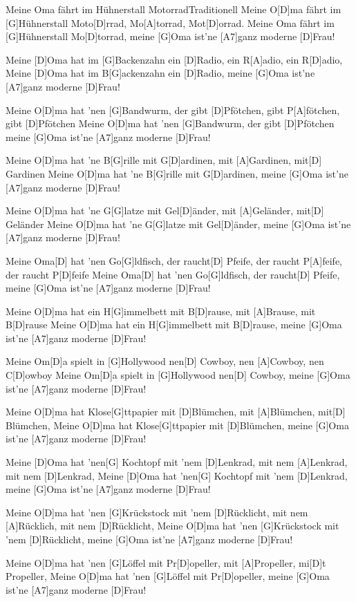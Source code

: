 \documentclass[../main.tex]{subfiles}
\begin{document}
\begin{song}{Meine Oma fährt im Hühnerstall Motorrad}{Traditionell}{}
Meine O[D]ma fährt im [G]Hühnerstall Moto[D]rrad, Mo[A]torrad, Mot[D]orrad.
Meine Oma fährt im [G]Hühnerstall Mo[D]torrad, meine [G]Oma ist’ne [A7]ganz moderne [D]Frau!

Meine [D]Oma hat im [G]Backenzahn ein [D]Radio, ein R[A]adio, ein R[D]adio,
Meine [D]Oma hat im B[G]ackenzahn ein [D]Radio, meine [G]Oma ist’ne [A7]ganz moderne [D]Frau!

Meine O[D]ma hat ’nen [G]Bandwurm, der gibt [D]Pfötchen, gibt P[A]fötchen, gibt [D]Pfötchen
Meine O[D]ma hat ’nen [G]Bandwurm, der gibt [D]Pfötchen meine [G]Oma ist’ne [A7]ganz moderne [D]Frau!

Meine O[D]ma hat ’ne B[G]rille mit G[D]ardinen, mit [A]Gardinen, mit[D] Gardinen
Meine O[D]ma hat ’ne B[G]rille mit G[D]ardinen, meine [G]Oma ist’ne [A7]ganz moderne [D]Frau!

Meine O[D]ma hat ’ne G[G]latze mit Gel[D]{ä}nder, mit [A]Geländer, mit[D] Geländer
Meine O[D]ma hat ’ne G[G]latze mit Gel[D]{ä}nder, meine [G]Oma ist’ne [A7]ganz moderne [D]Frau!

Meine Oma[D] hat ’nen Go[G]ldfisch, der raucht[D] Pfeife, der raucht P[A]feife, der raucht P[D]feife
Meine Oma[D] hat ’nen Go[G]ldfisch, der raucht[D] Pfeife, meine [G]Oma ist’ne [A7]ganz moderne [D]Frau!

Meine O[D]ma hat ein H[G]immelbett mit B[D]rause, mit [A]Brause, mit B[D]rause
Meine O[D]ma hat ein H[G]immelbett mit B[D]rause, meine [G]Oma ist’ne [A7]ganz moderne [D]Frau!

Meine Om[D]a spielt in [G]Hollywood nen[D] Cowboy, nen [A]Cowboy, nen C[D]owboy
Meine Om[D]a spielt in [G]Hollywood nen[D] Cowboy, meine [G]Oma ist’ne [A7]ganz moderne [D]Frau!

Meine O[D]ma hat Klose[G]ttpapier mit [D]Blümchen, mit [A]Blümchen, mit[D] Blümchen,
Meine O[D]ma hat Klose[G]ttpapier mit [D]Blümchen, meine [G]Oma ist’ne [A7]ganz moderne [D]Frau!

Meine [D]Oma hat ’nen[G] Kochtopf mit ’nem [D]Lenkrad, mit nem [A]Lenkrad, mit nem [D]Lenkrad,
Meine [D]Oma hat ’nen[G] Kochtopf mit ’nem [D]Lenkrad, meine [G]Oma ist’ne [A7]ganz moderne [D]Frau!

Meine O[D]ma hat ’nen [G]Krückstock mit ’nem [D]Rücklicht, mit nem [A]Rücklich, mit nem [D]Rücklicht,
Meine O[D]ma hat ’nen [G]Krückstock mit ’nem [D]Rücklicht, meine [G]Oma ist’ne [A7]ganz moderne [D]Frau!

Meine O[D]ma hat ’nen [G]Löffel mit Pr[D]opeller, mit [A]Propeller, mi[D]t Propeller,
Meine O[D]ma hat ’nen [G]Löffel mit Pr[D]opeller, meine [G]Oma ist’ne [A7]ganz moderne [D]Frau!


\end{song}
\end{document}
